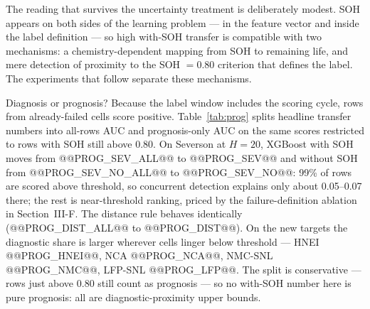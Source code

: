 The reading that survives the uncertainty treatment is deliberately modest. SOH appears on both sides of the learning problem --- in the feature vector and inside the label definition --- so high with-SOH transfer is compatible with two mechanisms: a chemistry-dependent mapping from SOH to remaining life, and mere detection of proximity to the SOH $=0.80$ criterion that defines the label. The experiments that follow separate these mechanisms.

Diagnosis or prognosis? Because the label window includes the scoring cycle, rows from already-failed cells score positive. Table~\ref{tab:prog} splits headline transfer numbers into all-rows AUC and prognosis-only AUC on the same scores restricted to rows with SOH still above 0.80. On Severson at $H{=}20$, XGBoost with SOH moves from @@PROG_SEV_ALL@@ to @@PROG_SEV@@ and without SOH from @@PROG_SEV_NO_ALL@@ to @@PROG_SEV_NO@@: 99\% of rows are scored above threshold, so concurrent detection explains only about 0.05--0.07 there; the rest is near-threshold ranking, priced by the failure-definition ablation in Section~III-F. The distance rule behaves identically (@@PROG_DIST_ALL@@ to @@PROG_DIST@@). On the new targets the diagnostic share is larger wherever cells linger below threshold --- HNEI @@PROG_HNEI@@, NCA @@PROG_NCA@@, NMC-SNL @@PROG_NMC@@, LFP-SNL @@PROG_LFP@@. The split is conservative --- rows just above 0.80 still count as prognosis --- so no with-SOH number here is pure prognosis: all are diagnostic-proximity upper bounds.

\begin{table}[!t]
\caption{Diagnosis Versus Prognosis at H=20 (ALL-LCO Source, Raw Scores): All-Rows Pooled AUC [Cell-Level CI Where Computed] Against Prognosis-Only AUC on Rows Scored While SOH$>$0.80, With the Share of Rows Scored Above Threshold. GRU and Distance-Rule Rows Are Point Estimates.}
\label{tab:prog}
\centering
{}
\end{table}

